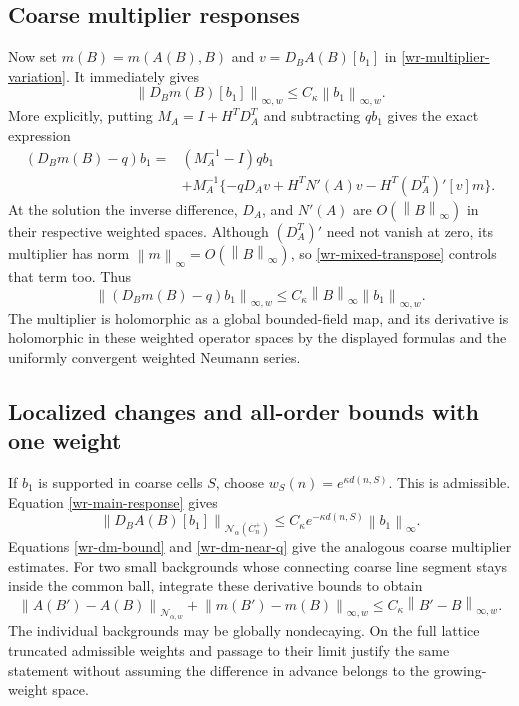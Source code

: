 \documentclass[11pt]{article}
\theoremstyle{remark}\newtheorem{remark}[theorem]{Remark}
\newcommand{\norm}[1]{\left\lVert#1\right\rVert}
\begin{document}
\subsection{Coarse multiplier responses}
\label{wr-multiplier-responses}

Now set $m(B)=m(A(B),B)$ and
$v=D_BA(B)[b_1]$ in \eqref{wr-multiplier-variation}. It immediately
gives
\begin{equation}\label{wr-dm-bound}
 \norm{D_Bm(B)[b_1]}_{\infty,w}
 \le C_\kappa\norm{b_1}_{\infty,w}.
\end{equation}
More explicitly, putting $M_A=I+H^TD_A^T$ and subtracting
$qb_1$ gives the exact expression
\begin{equation}\label{wr-dm-remainder}
 \begin{split}
 (D_Bm(B)-q)b_1={}&(M_A^{-1}-I)qb_1\\
 &+M_A^{-1}\{-qD_Av+H^TN'(A)v-H^T(D_A^T)'[v]m\}.
 \end{split}
\end{equation}
At the solution the inverse difference, $D_A$, and $N'(A)$
are $O(\norm{B}_\infty)$ in their respective weighted spaces.
Although $(D_A^T)'$ need not vanish at zero, its multiplier
has norm $\norm{m}_\infty=O(\norm{B}_\infty)$, so
\eqref{wr-mixed-transpose} controls that term too. Thus
\begin{equation}\label{wr-dm-near-q}
 \boxed{\quad
 \norm{(D_Bm(B)-q)b_1}_{\infty,w}
 \le C_\kappa\norm{B}_\infty\norm{b_1}_{\infty,w}.
 \quad}
\end{equation}
The multiplier is holomorphic as a global bounded-field map,
and its derivative is holomorphic in these weighted operator
spaces by the displayed formulas and the uniformly convergent
weighted Neumann series.

\subsection{Localized changes and all-order bounds with one weight}
\label{wr-localization}

If $b_1$ is supported in coarse cells $S$, choose
$w_S(n)=e^{\kappa d(n,S)}$. This is admissible. Equation
\eqref{wr-main-response} gives
\begin{equation}\label{wr-local-response}
 \norm{D_BA(B)[b_1]}_{\mathcal N_\alpha(C_n^+)}
 \le C_\kappa e^{-\kappa d(n,S)}\norm{b_1}_\infty.
\end{equation}
Equations \eqref{wr-dm-bound} and \eqref{wr-dm-near-q}
give the analogous coarse multiplier estimates. For two small
backgrounds whose connecting coarse line segment stays inside
the common ball, integrate these derivative bounds to obtain
\begin{equation}\label{wr-finite-difference}
 \norm{A(B')-A(B)}_{\mathcal N_{\alpha,w}}
 +\norm{m(B')-m(B)}_{\infty,w}
 \le C_\kappa\norm{B'-B}_{\infty,w}.
\end{equation}
The individual backgrounds may be globally nondecaying. On the
full lattice truncated admissible weights and passage to their
limit justify the same statement without assuming the difference
in advance belongs to the growing-weight space.
\end{document}
